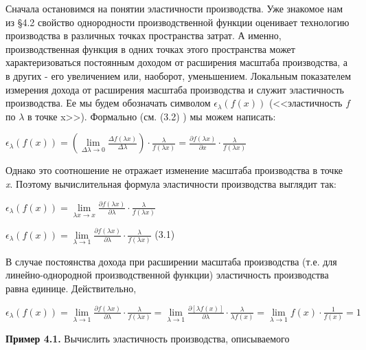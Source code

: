 \documentclass[12pt, 4paper]{book}
\begin{document}
{Сначала остановимся на понятии эластичности производства. Уже знакомое нам из §4.2 свойство однородности производственной функции оценивает технологию производства в различных точках пространства затрат. А именно, производственная функция в одних точках этого пространства может характеризоваться постоянным доходом от расширения масштаба производства, а в других - его увеличением или, наоборот, уменьшением. Локальным показателем измерения дохода от расширения масштаба производства и служит эластичность производства. Ее мы будем обозначать символом $\epsilon_{\lambda}(f(x))$ (<<эластичность $f$ по $\lambda$ в точке x>>). Формально (см. (3.2) ) мы можем написать:
\begin{center}
$\epsilon_{\lambda}(f(x))=(\lim\limits_{\Delta \lambda \rightarrow 0} \frac{\Delta f(\lambda x)}{\Delta \lambda})\cdot \frac{\lambda}{f(\lambda x)}=\frac{\partial f(\lambda x)}{\partial x}\cdot \frac{\lambda}{f(\lambda x)}$
\end{center}
\par

Однако это соотношение не отражает изменение масштаба производства в точке \textit{x}. Поэтому вычислительная формула эластичности производства выглядит так: 
\begin{center}
 $\epsilon_{\lambda}(f(x))=\lim\limits_{\lambda x \rightarrow x}\frac{\partial f(\lambda x)}{\partial \lambda}\cdot \frac{\lambda}{f(\lambda x)}$
\end{center}
\begin{center}
 $\epsilon_{\lambda}(f(x))=\lim\limits_{\lambda \rightarrow 1}\frac{\partial f(\lambda x)}{\partial \lambda}\cdot \frac{\lambda}{f(\lambda x)}$ (3.1)
\end{center}
\par

В случае постоянства дохода при расширении масштаба производства (т.е. для линейно-однородной производственной функции) эластичность производства равна единице. Действительно, 
\begin{center}
$\epsilon_{\lambda}(f(x))=\lim\limits_{\lambda \rightarrow 1}\frac{\partial f(\lambda x)}{\partial \lambda}\cdot \frac{\lambda}{f(\lambda x)}=\lim\limits_{\lambda \rightarrow 1}\frac{\partial [\lambda f(x)]}{\partial \lambda}\cdot \frac{\lambda }{\lambda f(x)}=\lim\limits_{\lambda \rightarrow 1}f(x) \cdot \frac{1}{f(x)}=1$ 
\end{center}
\par

\textbf{Пример 4.1.} Вычислить эластичность производства, описываемого 
\par
 
}
\end{document}
